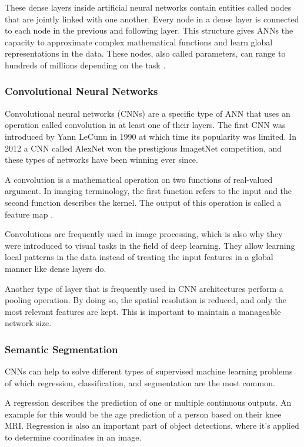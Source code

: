 These dense layers inside artificial neural networks contain entities called nodes that are jointly linked with one another. Every node in a dense layer is connected to each node in the previous and following layer. This structure gives ANNs the capacity to approximate complex mathematical functions and learn global representations in the data. These nodes, also called parameters, can range to hundreds of millions depending on the task \cite{Simonyan2014a}.

\subsubsection{Convolutional Neural Networks}

Convolutional neural networks (CNNs) are a specific type of ANN that uses an operation called convolution in at least one of their layers. The first CNN was introduced by Yann LeCunn \cite{LeCun1990} in 1990 at which time its popularity was limited. In 2012 a CNN called AlexNet \cite{Krizhevsky} won the prestigious ImagetNet competition, and these types of networks have been winning ever since.

A convolution is a mathematical operation on two functions of real-valued argument. In imaging terminology, the first function refers to the input and the second function describes the kernel. The output of this operation is called a feature map \cite{Goodfellow2016}.

Convolutions are frequently used in image processing, which is also why they were introduced to visual tasks in the field of deep learning. They allow learning local patterns in the data instead of treating the input features in a global manner like dense layers do.

Another type of layer that is frequently used in CNN architectures perform a pooling operation. By doing so, the spatial resolution is reduced, and only the most relevant features are kept. This is important to maintain a manageable network size.

\subsubsection{Semantic Segmentation}

CNNs can help to solve different types of supervised machine learning problems of which regression, classification, and segmentation are the most common.

A regression describes the prediction of one or multiple continuous outputs. An example for this would be the age prediction of a person based on their knee MRI. Regression is also an important part of object detections, where it's applied to determine coordinates in an image.

